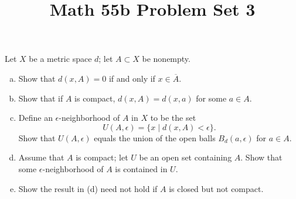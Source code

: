 \documentclass[11pt,letterpaper]{article}
\title{\textbf{Math 55b Problem Set 3}}
\begin{document}
\maketitle

\begin{problem}
    Let $X$ be a metric space $d$; let $A\subset X$ be nonempty.
    \begin{enumerate}[(a)]
        \item Show that $d(x, A) = 0$ if and only if $x\in \overline{A}$.
        \item Show that if $A$ is compact, $d(x, A)=d(x,a)$ for some $a\in A$.
        \item Define an $\epsilon$-neighborhood of $A$ in $X$ to be the set
        \[
            U(A,\epsilon) = \{x\mid d(x,A)<\epsilon\}    
        .\] 
        Show that $U(A,\epsilon)$ equals the union of the open balls $B_d(a,\epsilon)$ for $a\in A$.
        \item Assume that $A$ is compact; let $U$ be an open set containing $A$. Show that
        some $\epsilon$-neighborhood of $A$ is contained in $U$.
        \item Show the result in (d) need not hold if $A$ is closed but not compact.
    \end{enumerate}
\end{problem}
\end{document}
